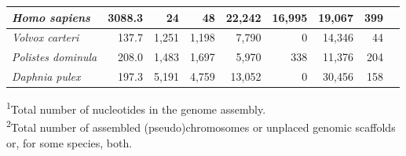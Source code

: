 \begin{table}[t]
\begin{tabularx}{\textwidth}{lrrrrrrrr}
\textit{Homo sapiens}               &                 3088.3 &                        24 &           48 &       22,242 &       16,995 &       19,067 &          399   \\ \hline
\textit{Volvox carteri}             &                  137.7 &                     1,251 &        1,198 &        7,790 &            0 &       14,346 &           44   \\
\textit{Polistes dominula}          &                  208.0 &                     1,483 &        1,697 &        5,970 &          338 &       11,376 &          204   \\
\textit{Daphnia pulex}              &                  197.3 &                     5,191 &        4,759 &       13,052 &            0 &       30,456 &          158   \\ \hline
\end{tabularx}
\raggedright
{\scriptsize
\textsuperscript{1}Total number of nucleotides in the genome assembly. \\
\textsuperscript{2}Total number of assembled (pseudo)chromosomes or unplaced genomic scaffolds or, for some species, both. \\
}
\end{table}

